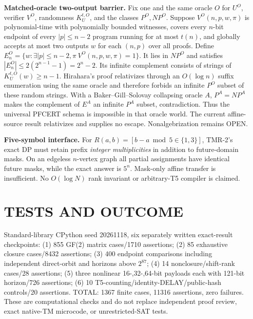 \documentclass[11pt]{article}
\begin{document}
\noindent\textbf{Matched-oracle two-output barrier.}
Fix one and the same oracle $O$ for $U^O$, verifier $V^O$, randomness $K_U^{t,O}$, and the classes $P^O,NP^O$. Suppose $V^O(n,p,w,\pi)$ is polynomial-time with polynomially bounded witnesses, covers every $n$-bit endpoint of every $|p|\le n-2$ program running for at most $t(n)$, and globally accepts at most two outputs $w$ for each $(n,p)$ over all proofs. Define $E^O_n=\{w:\exists |p|\le n-2,\pi\ V^O(n,p,w,\pi)=1\}$. It lies in $NP^O$ and satisfies $|E^O_n|\le2(2^{n-1}-1)=2^n-2$. Its infinite complement consists of strings of $K_U^{t,O}(w)\ge n-1$. Hirahara's proof relativizes through an $O(\log n)$ suffix enumeration using the same oracle and therefore forbids an infinite $P^O$ subset of these random strings. With a Baker--Gill--Solovay collapsing oracle $A$, $P^A=NP^A$ makes the complement of $E^A$ an infinite $P^A$ subset, contradiction. Thus the universal PFCERT schema is impossible in that oracle world. The current affine-source result relativizes and supplies no escape. Nonalgebrization remains OPEN.

\noindent\textbf{Five-symbol interface.}
For $R(a,b)=[b-a\bmod5\in\{1,3\}]$, TMR-2's exact DP must retain prefix \emph{integer multiplicities} in addition to future-domain masks. On an edgeless $n$-vertex graph all partial assignments have identical future masks, while the exact answer is $5^n$. Mask-only affine transfer is insufficient. No $O(\log N)$ rank invariant or arbitrary-T5 compiler is claimed.
\section{TESTS AND OUTCOME}
Standard-library CPython seed 20261118, six separately written exact-result checkpoints: (1) 855 GF(2) matrix cases/1710 assertions; (2) 85 exhaustive closure cases/8432 assertions; (3) 400 endpoint comparisons including independent direct-orbit and horizons above $2^{87}$; (4) 14 nonclosure/shift-rank cases/28 assertions; (5) three nonlinear 16-,32-,64-bit payloads each with 121-bit horizon/726 assertions; (6) 10 T5-counting/identity-DELAY/public-hash controls/20 assertions. TOTAL: 1367 finite cases, 11316 assertions, zero failures. These are computational checks and do not replace independent proof review, exact native-TM microcode, or unrestricted-SAT tests.
\end{document}
